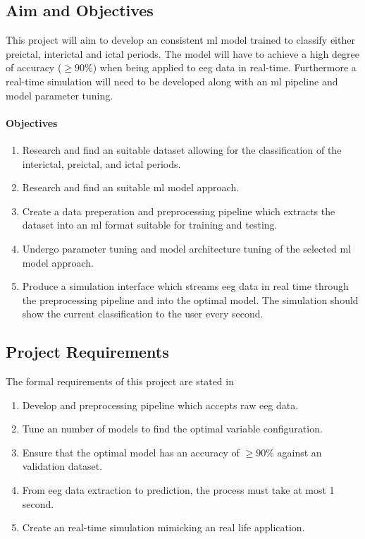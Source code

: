 \documentclass[12pt]{article}
\begin{document}
\subsection{Aim and Objectives}

This project will aim to develop an consistent \acrshort{ml} model trained to classify either preictal, interictal and ictal periods. The model will have to achieve a high degree of accuracy ($\geq90\%$) when being applied to \acrshort{eeg} data in real-time. Furthermore a real-time simulation will need to be developed along with an \acrshort{ml} pipeline and model parameter tuning. 

 
\paragraph{Objectives} \label{objectives}

\begin{enumerate}
	\item Research and find an suitable dataset allowing for the classification of the interictal, preictal, and ictal periods. 
	\item Research and find an suitable \acrshort{ml} model approach.
        \item Create a data preperation and preprocessing pipeline which extracts the dataset into an \acrshort{ml} format suitable for training and testing. 
        \item Undergo parameter tuning and model architecture tuning of the selected \acrshort{ml} model approach.
        \item Produce a simulation interface which streams \acrshort{eeg} data in real time through the preprocessing pipeline and into the optimal model. The simulation should show the current classification to the user every second.
\end{enumerate}

\subsection{Project Requirements}\label{requirements}

The formal requirements of this project are stated in 

\begin{enumerate} 
	\item{Develop and preprocessing pipeline which accepts raw \acrshort{eeg} data.}
	\item{Tune an number of models to find the optimal variable configuration.}
	\item{Ensure that the optimal model has an accuracy of $\geq90\%$ against an validation dataset.}
	\item{From \acrshort{eeg} data extraction to prediction, the process must take at most 1 second.}
	\item{Create an real-time simulation mimicking an real life application.}
\end{enumerate}
\end{document}
